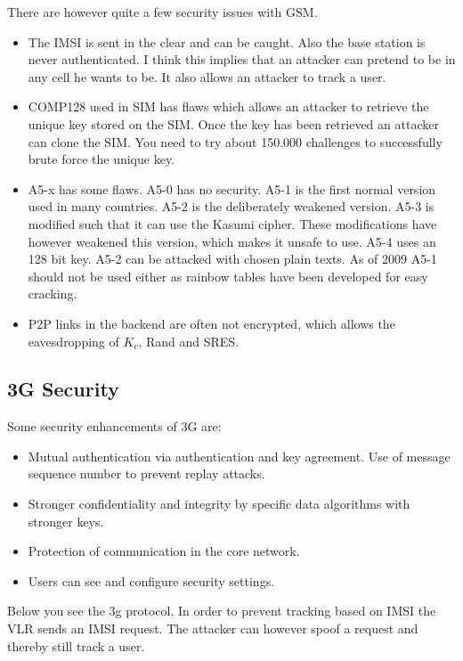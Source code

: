 \documentclass{article}
\begin{document}
There are however quite a few security issues with GSM.

\begin{itemize}
\item The IMSI is sent in the clear and can be caught. Also the base station is never authenticated. I think this implies that an attacker can pretend to be in any cell he wants to be. It also allows an attacker to track a user.
\item COMP128 used in SIM has flaws which allows an attacker to retrieve the unique key stored on the SIM. Once the key has been retrieved an attacker can clone the SIM. You need to try about 150.000 challenges to successfully brute force the unique key.
\item A5-x has some flaws. A5-0 has no security. A5-1 is the first normal version used in many countries. A5-2 is the deliberately weakened version. A5-3 is modified such that it can use the Kasumi cipher. These modifications have however weakened this version, which makes it unsafe to use. A5-4 uses an 128 bit key. A5-2 can be attacked with chosen plain texts. As of 2009 A5-1 should not be used either as rainbow tables have been developed for easy cracking.
\item P2P links in the backend are often not encrypted, which allows the eavesdropping of $K_c$, Rand and SRES.
\end{itemize}

\subsection*{3G Security}
Some security enhancements of 3G are: 

\begin{itemize}
\item Mutual authentication via authentication and key agreement. Use of message sequence number to prevent replay attacks.
\item Stronger confidentiality and integrity by specific data algorithms with stronger keys.
\item Protection of communication in the core network.
\item Users can see and configure security settings.
\end{itemize}

Below you see the 3g protocol. In order to prevent tracking based on IMSI the VLR sends an IMSI request. The attacker can however spoof a request and thereby still track a user. 
\end{document}
